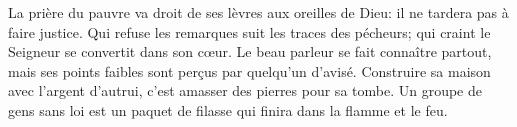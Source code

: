 La prière du pauvre va droit de ses lèvres aux oreilles de Dieu:
	il ne tardera pas à faire justice.
Qui refuse les remarques suit les traces des pécheurs;
	qui craint le Seigneur se convertit dans son cœur.
Le beau parleur se fait connaître partout,
	mais ses points faibles sont perçus par quelqu’un d’avisé.
Construire sa maison avec l’argent d’autrui,
	c’est amasser des pierres pour sa tombe.
Un groupe de gens sans loi
	est un paquet de filasse qui finira dans la flamme et le feu.
